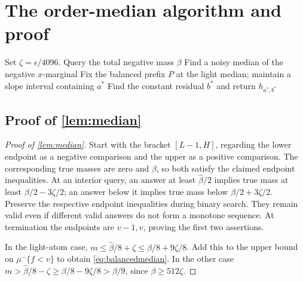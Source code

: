 \section{The order-median algorithm and proof}\label{app:proofs-C}
\begin{algorithm}[t]
\caption{Order-median learner}\label{alg:median}
Set $\zeta=\epsilon/4096$. Query the total negative mass $\beta$\;
Find a noisy median of the negative $x$-marginal\;
Fix the balanced prefix $P$ at the light median; maintain a slope interval containing $a^*$\;
Find the constant residual $b^*$ and return $h_{a^*,b^*}$\;
\end{algorithm}



\subsection[Proof of result median]{Proof of \cref{lem:median}}\label{proof:median}
\begin{proof}[Proof of \cref{lem:median}]
Start with the bracket $[L-1,H]$, regarding the lower endpoint as a negative comparison and the upper as a positive comparison. The corresponding true masses are zero and $\beta$, so both satisfy the claimed endpoint inequalities. At an interior query, an answer at least $\widehat\beta/2$ implies true mass at least $\beta/2-3\zeta/2$; an answer below it implies true mass below $\beta/2+3\zeta/2$. Preserve the respective endpoint inequalities during binary search. They remain valid even if different valid answers do not form a monotone sequence. At termination the endpoints are $v-1,v$, proving the first two assertions.

In the light-atom case, $m\le\widehat\beta/8+\zeta\le\beta/8+9\zeta/8$. Add this to the upper bound on $\mu^-\{f<v\}$ to obtain \eqref{eq:balancedmedian}. In the other case $m>\widehat\beta/8-\zeta\ge\beta/8-9\zeta/8>\beta/9$, since $\beta\ge512\zeta$.
\end{proof}

